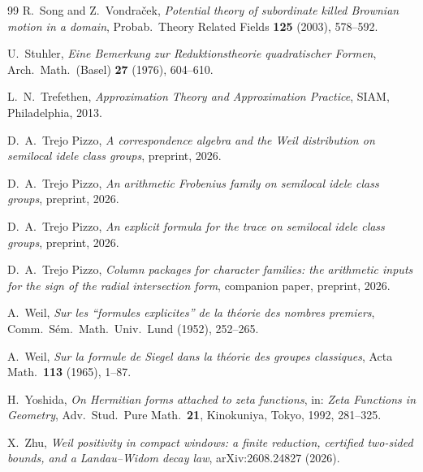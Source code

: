 \documentclass[10pt]{amsart}
\theoremstyle{definition}
\theoremstyle{remark}
\begin{document}
\begin{thebibliography}{99}
 R.~Song and Z.~Vondra\v{c}ek, \emph{Potential theory of subordinate
killed Brownian motion in a domain}, Probab.~Theory Related Fields \textbf{125} (2003), 578--592.

 U.~Stuhler, \emph{Eine Bemerkung zur Reduktionstheorie quadratischer
Formen}, Arch.\ Math.\ (Basel) \textbf{27} (1976), 604--610.

 L.~N.~Trefethen, \emph{Approximation Theory and Approximation Practice},
SIAM, Philadelphia, 2013.

 D.~A.~Trejo Pizzo,
\emph{A correspondence algebra and the Weil distribution on semilocal idele
class groups}, preprint, 2026.

 D.~A.~Trejo Pizzo,
\emph{An arithmetic Frobenius family on semilocal idele class groups},
preprint, 2026.

 D.~A.~Trejo Pizzo, \emph{An explicit formula for the trace on semilocal idele class groups}, preprint, 2026.

 D.~A.~Trejo Pizzo, \emph{Column packages for character families: the
arithmetic inputs for the sign of the radial intersection form}, companion paper, preprint, 2026.

 A.~Weil, \emph{Sur les ``formules explicites'' de la th\'eorie des nombres
premiers}, Comm.~S\'em.~Math.~Univ.~Lund (1952), 252--265.

 A.~Weil, \emph{Sur la formule de Siegel dans la th\'eorie des groupes
classiques}, Acta Math.\ \textbf{113} (1965), 1--87.

 H.~Yoshida, \emph{On Hermitian forms attached to zeta functions}, in:
\emph{Zeta Functions in Geometry}, Adv.~Stud.~Pure Math.~\textbf{21}, Kinokuniya, Tokyo, 1992, 281--325.

 X.~Zhu, \emph{Weil positivity in compact windows: a finite reduction, certified
two-sided bounds, and a Landau--Widom decay law}, arXiv:2608.24827 (2026).
\end{thebibliography}
\end{document}
